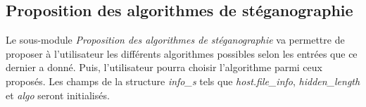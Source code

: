 \documentclass[11pt]{article}
\begin{document}



\subsection{Proposition des algorithmes 
de stéganographie}

Le sous-module \textit{Proposition des algorithmes de stéganographie} va 
permettre de proposer à l'utilisateur les différents algorithmes possibles 
selon les entrées que ce dernier a donné. Puis, l'utilisateur pourra choisir 
l'algorithme parmi ceux proposés.
Les champs de la structure \textit{info\_s} tels que \textit{host.file\_info}, 
\textit{hidden\_length} et \textit{algo} seront initialisés. 
\newline
\end{document}
